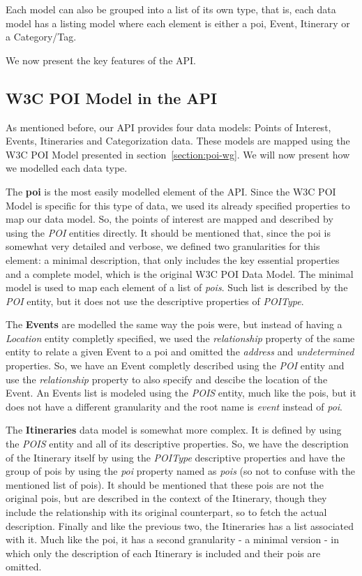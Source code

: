 \documentclass[times,doublespace]{ettauth}%
\begin{document}
Each model can also be grouped into a list of its own type, that is, each data model has a listing model where each element is either a \ac{poi}, Event, Itinerary or a Category/Tag.

We now present the key features of the API\@.

\subsection{W3C POI Model in the API}
\label{section:w3cpoi}
As mentioned before, our API provides four data models: Points of Interest, Events, Itineraries and Categorization data. These models are mapped using the W3C POI Model presented in section~\ref{section:poi-wg}. We will now present how we modelled each data type.

The \textbf{\acf{poi}} is the most easily modelled element of the API\@. Since the W3C POI Model is specific for this type of data, we used its already specified properties to map our data model. So, the points of interest are mapped and described by using the \textit{POI} entities directly. It should be mentioned that, since the \ac{poi} is somewhat very detailed and verbose, we defined two granularities for this element: a minimal description, that only includes the key essential properties and a complete model, which is the original W3C POI Data Model. The minimal model is used to map each element of a list of \textit{\acp{poi}}. Such list is described by the \textit{POI} entity, but it does not use the descriptive properties of \textit{POIType}.

The \textbf{Events} are modelled the same way the \acp{poi} were, but instead of having a \textit{Location} entity completly specified, we used the \textit{relationship} property of the same entity to relate a given Event to a \ac{poi} and omitted the \textit{address} and \textit{undetermined} properties. So, we have an Event completly described using the \textit{POI} entity and use the \textit{relationship} property to also specify and descibe the location of the Event. An Events list is modeled using the \textit{POIS} entity, much like the \acp{poi}, but it does not have a different granularity and the root name is \textit{event} instead of \textit{poi}.

The \textbf{Itineraries} data model is somewhat more complex. It is defined by using the \textit{POIS} entity and all of its descriptive properties. So, we have the description of the Itinerary itself by using the \textit{POIType} descriptive properties and have the group of \acp{poi} by using the \textit{poi} property named as \textit{pois} (so not to confuse with the mentioned list of \acp{poi}). It should be mentioned that these \acp{poi} are not the original \acp{poi}, but are described in the context of the Itinerary, though they include the relationship with its original counterpart, so to fetch the actual description. Finally and like the previous two, the Itineraries has a list associated with it. Much like the \ac{poi}, it has a second granularity - a minimal version - in which only the description of each Itinerary is included and their \acp{poi} are omitted.
\end{document}
